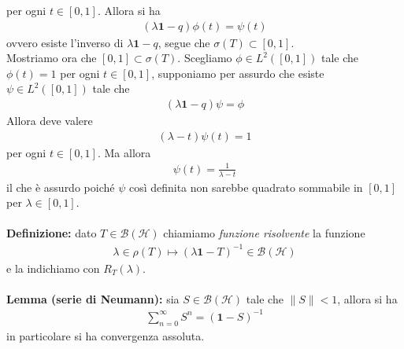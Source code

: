 \documentclass{article}
\numberwithin{equation}{subsection}
\begin{document}
per ogni $t \in [0, 1]$. Allora si ha 
\begin{align*}
    (\lambda\mathbf{1} - q)\phi(t) = \psi(t) 
\end{align*}
ovvero esiste l'inverso di $\lambda\mathbf{1} - q$, segue che $\sigma(T) \subset [0, 1]$. \\
Mostriamo ora che $[0, 1] \subset \sigma(T)$. Scegliamo $\phi \in L^2([0, 1])$ tale che $\phi(t) = 1$ per ogni $t \in [0, 1]$, supponiamo per assurdo che esiste $\psi \in L^2([0, 1])$ tale che 
\begin{align*}
    (\lambda\mathbf{1} - q)\psi = \phi 
\end{align*}
Allora deve valere 
\begin{align*}
    (\lambda - t)\psi(t) = 1 
\end{align*}
per ogni $t \in [0, 1]$. Ma allora 
\begin{align*}
    \psi(t) = \frac{1}{\lambda - t} 
\end{align*}
il che è assurdo poiché $\psi$ così definita non sarebbe quadrato sommabile in $[0, 1]$ per $\lambda \in [0, 1]$. \\ \\
\textbf{Definizione:} dato $T \in \mathcal{B}(\mathcal{H})$ chiamiamo \textit{funzione risolvente} la funzione 
\begin{align*}
    \lambda \in \rho(T) \mapsto (\lambda\mathbf{1} - T)^{-1} \in \mathcal{B}(\mathcal{H}) 
\end{align*}
e la indichiamo con $R_T(\lambda)$. \\ \\
\textbf{Lemma (serie di Neumann):} sia $S \in \mathcal{B}(\mathcal{H})$ tale che $\|S\| < 1$, allora si ha
\begin{align*}
    \sum_{n = 0}^\infty S^n = (\mathbf{1} - S)^{-1} 
\end{align*}
in particolare si ha convergenza assoluta. \\
\end{document}
